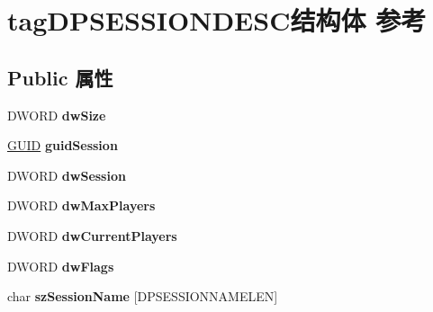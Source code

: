 \hypertarget{structtag_d_p_s_e_s_s_i_o_n_d_e_s_c}{}\section{tag\+D\+P\+S\+E\+S\+S\+I\+O\+N\+D\+E\+S\+C结构体 参考}
\label{structtag_d_p_s_e_s_s_i_o_n_d_e_s_c}
\subsection*{Public 属性}
\begin{DoxyCompactItemize}
\item 
\mbox{\label{structtag_d_p_s_e_s_s_i_o_n_d_e_s_c_aff006814e1d18e23be110b28d5ccf7b1}} 
D\+W\+O\+RD {\bfseries dw\+Size}
\item 
\mbox{\label{structtag_d_p_s_e_s_s_i_o_n_d_e_s_c_ad25afba842833371df9c8eed7e76df08}} 
\hyperlink{interface_g_u_i_d}{G\+U\+ID} {\bfseries guid\+Session}
\item 
\mbox{\label{structtag_d_p_s_e_s_s_i_o_n_d_e_s_c_ac0b1618dc19cafc242ba94fa324407f1}} 
D\+W\+O\+RD {\bfseries dw\+Session}
\item 
\mbox{\label{structtag_d_p_s_e_s_s_i_o_n_d_e_s_c_ada7da2c747f2fd39c517db1458578fef}} 
D\+W\+O\+RD {\bfseries dw\+Max\+Players}
\item 
\mbox{\label{structtag_d_p_s_e_s_s_i_o_n_d_e_s_c_af923af9f62e473e0cf3be59b33351d35}} 
D\+W\+O\+RD {\bfseries dw\+Current\+Players}
\item 
\mbox{\label{structtag_d_p_s_e_s_s_i_o_n_d_e_s_c_aac8e01695078e0e92718e5a2ea4d66c3}} 
D\+W\+O\+RD {\bfseries dw\+Flags}
\item 
\mbox{\label{structtag_d_p_s_e_s_s_i_o_n_d_e_s_c_a48db600985cf6e73a9a81d01d45be756}} 
char {\bfseries sz\+Session\+Name} \mbox{[}D\+P\+S\+E\+S\+S\+I\+O\+N\+N\+A\+M\+E\+L\+EN\mbox{]}
\item 
\mbox{\label{structtag_d_p_s_e_s_s_i_o_n_d_e_s_c_a56391b97d0cda56829f8bfdf7f3a4f9f}} 

\end{DoxyCompactItemize}
